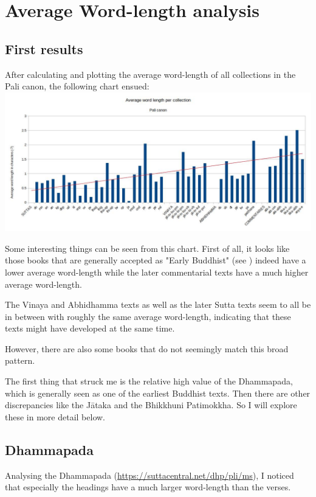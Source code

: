 \section{Average Word-length analysis}
\subsection{First results}
After calculating and plotting the average word-length of all collections in the Pali canon, the following chart ensued:\\

\includegraphics[width=\linewidth]{chart1.jpg}
\label{chart1}

\medskip
Some interesting things can be seen from this chart. First of all, it looks like those books that are generally accepted as "Early Buddhist" (see \citep{sujatobrahmali}) indeed have a lower average word-length while the later commentarial texts have a much higher average word-length.

The Vinaya and Abhidhamma texts as well as the later Sutta texts seem to all be in between with roughly the same average word-length, indicating that these texts might have developed at the same time.

However, there are also some books that do not seemingly match this broad pattern.

The first thing that struck me is the relative high value of the Dhammapada, which is generally seen as one of the earliest Buddhist texts. Then there are other discrepancies like the Jātaka and the Bhikkhuni Patimokkha. So I will explore these in more detail below.

\subsection{Dhammapada}
Analysing the Dhammapada (\url{https://suttacentral.net/dhp/pli/ms}), I noticed that especially the headings have a much larger word-length than the verses. 

